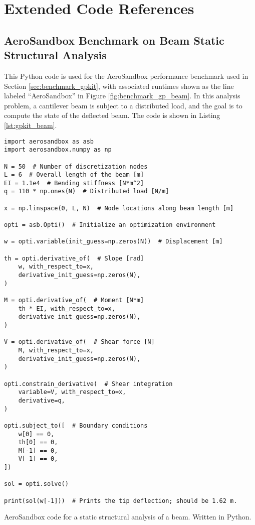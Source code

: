 \chapter{Extended Code References}
\label{chap:code}


\section{AeroSandbox Benchmark on Beam Static Structural Analysis}

This Python code is used for the AeroSandbox performance benchmark used in Section \ref{sec:benchmark_gpkit}, with associated runtimes shown as the line labeled ``AeroSandbox'' in Figure \ref{fig:benchmark_gp_beam}. In this analysis problem, a cantilever beam is subject to a distributed load, and the goal is to compute the state of the deflected beam. The code is shown in Listing \ref{lst:gpkit_beam}.

\begin{listing}[h]
    \begin{verbatim}
import aerosandbox as asb
import aerosandbox.numpy as np

N = 50  # Number of discretization nodes
L = 6  # Overall length of the beam [m]
EI = 1.1e4  # Bending stiffness [N*m^2]
q = 110 * np.ones(N)  # Distributed load [N/m]

x = np.linspace(0, L, N)  # Node locations along beam length [m]

opti = asb.Opti()  # Initialize an optimization environment

w = opti.variable(init_guess=np.zeros(N))  # Displacement [m]

th = opti.derivative_of(  # Slope [rad]
    w, with_respect_to=x,
    derivative_init_guess=np.zeros(N),
)

M = opti.derivative_of(  # Moment [N*m]
    th * EI, with_respect_to=x,
    derivative_init_guess=np.zeros(N),
)

V = opti.derivative_of(  # Shear force [N]
    M, with_respect_to=x,
    derivative_init_guess=np.zeros(N),
)

opti.constrain_derivative(  # Shear integration
    variable=V, with_respect_to=x,
    derivative=q,
)

opti.subject_to([  # Boundary conditions
    w[0] == 0,
    th[0] == 0,
    M[-1] == 0,
    V[-1] == 0,
])

sol = opti.solve()

print(sol(w[-1]))  # Prints the tip deflection; should be 1.62 m.
    \end{verbatim}
    \caption{AeroSandbox code for a static structural analysis of a beam. Written in Python.}
    \label{lst:gpkit_beam}
\end{listing}


